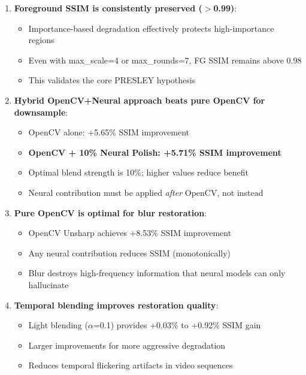 \documentclass[11pt,a4paper]{article}
\begin{document}
\begin{enumerate}
    \item \textbf{Foreground SSIM is consistently preserved ($>$0.99)}:
    \begin{itemize}
        \item Importance-based degradation effectively protects high-importance regions
        \item Even with max\_scale=4 or max\_rounds=7, FG SSIM remains above 0.98
        \item This validates the core PRESLEY hypothesis
    \end{itemize}
    
    \item \textbf{Hybrid OpenCV+Neural approach beats pure OpenCV for downsample}:
    \begin{itemize}
        \item OpenCV alone: +5.65\% SSIM improvement
        \item \textbf{OpenCV + 10\% Neural Polish: +5.71\% SSIM improvement}
        \item Optimal blend strength is 10\%; higher values reduce benefit
        \item Neural contribution must be applied \emph{after} OpenCV, not instead
    \end{itemize}
    
    \item \textbf{Pure OpenCV is optimal for blur restoration}:
    \begin{itemize}
        \item OpenCV Unsharp achieves +8.53\% SSIM improvement
        \item Any neural contribution reduces SSIM (monotonically)
        \item Blur destroys high-frequency information that neural models can only hallucinate
    \end{itemize}
    
    \item \textbf{Temporal blending improves restoration quality}:
    \begin{itemize}
        \item Light blending ($\alpha$=0.1) provides +0.03\% to +0.92\% SSIM gain
        \item Larger improvements for more aggressive degradation
        \item Reduces temporal flickering artifacts in video sequences
    \end{itemize}
    

\end{enumerate}
\end{document}
